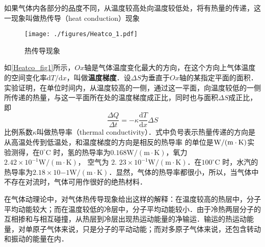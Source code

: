 
如果气体内各部分的品度不同，从温度较高处向温度较低处，将有热量的传递，这一现象叫做热传导（heat conduction）现象

\begin{figure}[ht]
\centering
\texttt{[image: ./figures/Heatco\_1.pdf]}
\caption{热传导现象} \label{Heatco_fig1}
\end{figure}

如\autoref{Heatco_fig1}所示，$Ox$轴是气体温度变化最大的方向，在这个方向上气体温度的空间变化率$\mathrm dT/\mathrm dx$，叫做\textbf{温度梯度}．设$\Delta S$为垂直于$Ox $轴的某指定平面的面积．实验证明，在单位时间内，从温度较高的一侧，通过这一平面，向温度较低的一侧所传递的热量，与这一平面所在处的温度梯度成正比，同时也与面积$\Delta S$成正比，即
\begin{equation}
\frac{\Delta Q}{\Delta t}=-\kappa \frac{\mathrm{d} T}{\mathrm{d} x} \Delta S
\end{equation}
比例系数$\kappa$叫做热导率（thermal conductivity）．式中负号表示热量传递的方向是从高温处传到低温处，和温度梯度的方向是相反的热导率
的单位是$\rm W /(m \cdot K)$实验测得，在$0^{\circ} \mathrm{C}$ 时，氢的热导率为$0.168 \mathrm{W} /(\mathrm{m} \cdot \mathrm{K})$，氧力$2.42\times 10^{-1} \mathrm{W} /(\mathrm{m} \cdot \mathrm{K})$， 空气为$\text { 2. } 23 \times 10^{-1} \mathrm{W} /(\mathrm{m} \cdot \mathrm{K})$．在$100^{\circ} \mathrm{C}$ 时，水汽的热导率为$2. 18\times  10{-1}\mathrm{W} /(\mathrm{m} \cdot \mathrm{K})$．显然，气体的热导率都很小，所以，当气体中不存在对流时，气体可用作很好的绝热材料．

在气体动理论中，对气体热传导现象给出这样的解释：在温度较高的热层中，分子平均动能较大；而在温度较低的冷层中，分子平均动能较小．由于冷热两层分子的互相掺和与相互碰撞，从热层到冷层出现热运动能量的净输运．输运的热运动能量，对单原子气体来说，只是分子的平动动能；而对多原子气体来说，还包含转动和振动的能量在内．